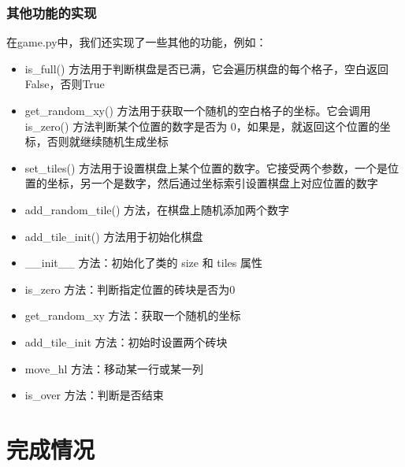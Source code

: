 \documentclass[UTF8,AutoFakeBold,AutoFakeSlant,zihao=-4]{ctexart}
\begin{document}
\subsubsection{其他功能的实现}
在game.py中，我们还实现了一些其他的功能，例如：

\begin{itemize}
  \item is\_full() 方法用于判断棋盘是否已满，它会遍历棋盘的每个格子，空白返回False，否则True
  \item get\_random\_xy() 方法用于获取一个随机的空白格子的坐标。它会调用 is\_zero() 方法判断某个位置的数字是否为 0，如果是，就返回这个位置的坐标，否则就继续随机生成坐标
  \item set\_tiles() 方法用于设置棋盘上某个位置的数字。它接受两个参数，一个是位置的坐标，另一个是数字，然后通过坐标索引设置棋盘上对应位置的数字
  \item add\_random\_tile() 方法，在棋盘上随机添加两个数字
  \item add\_tile\_init() 方法用于初始化棋盘
  \item \_\_init\_\_ 方法：初始化了类的 size 和 tiles 属性
  \item is\_zero 方法：判断指定位置的砖块是否为0
  \item get\_random\_xy 方法：获取一个随机的坐标
  \item add\_tile\_init 方法：初始时设置两个砖块
  \item move\_hl 方法：移动某一行或某一列
  \item is\_over 方法：判断是否结束
\end{itemize}

\clearpage


\section{完成情况}
\end{document}

